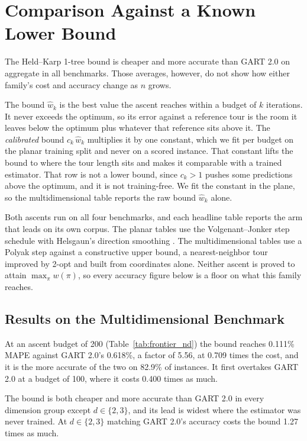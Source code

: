 \documentclass{article}
\begin{document}
\section{Comparison Against a Known Lower Bound} \label{sec:frontier}

 The Held--Karp 1-tree bound is cheaper and more accurate than GART 2.0 on aggregate in all benchmarks. Those averages, however, do not show how either family's cost and accuracy change as $n$ grows. 

The bound $\hat w_k$ is the best value the ascent reaches within a budget of $k$ iterations. It never exceeds the optimum, so its error against a reference tour is the room it leaves below the optimum plus whatever that reference sits above it. The \emph{calibrated} bound $c_k\,\hat w_k$ multiplies it by one constant, which we fit per budget on the planar training split and never on a scored instance. That constant lifts the bound to where the tour length sits and makes it comparable with a trained estimator. That row is not a lower bound, since $c_k>1$ pushes some predictions above the optimum, and it is not training-free. We fit the constant in the plane, so the multidimensional table reports the raw bound $\hat w_k$ alone.

Both ascents run on all four benchmarks, and each headline table reports the arm that leads on its own corpus. The planar tables use the Volgenant--Jonker step schedule with Helsgaun's direction smoothing \citep{volgenant1982,helsgaun2000}. The multidimensional tables use a Polyak step \citep{polyak1969} against a constructive upper bound, a nearest-neighbor tour improved by 2-opt and built from coordinates alone. Neither ascent is proved to attain $\max_\pi w(\pi)$, so every accuracy figure below is a floor on what this family reaches.  


\subsection{Results on the Multidimensional Benchmark} \label{subsec:frontier_nd}

At an ascent budget of 200 (Table~\ref{tab:frontier_nd}) the bound reaches 0.111\% MAPE against GART 2.0's 0.618\%, a factor of 5.56, at 0.709 times the cost, and it is the more accurate of the two on 82.9\% of instances. It first overtakes GART 2.0 at a budget of 100, where it costs 0.400 times as much.

The bound is both cheaper and more accurate than GART 2.0 in every dimension group except $d\in\{2,3\}$, and its lead is widest where the estimator was never trained. At $d\in\{2,3\}$ matching GART 2.0's accuracy costs the bound 1.27 times as much.
\end{document}
